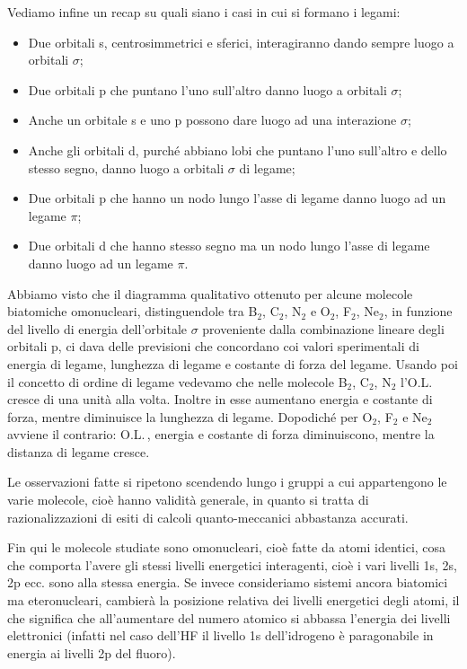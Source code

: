 \vspace{0.2cm}Vediamo infine un recap su quali siano i casi in cui si formano i legami:
\begin{itemize}
    \item Due orbitali s, centrosimmetrici e sferici, interagiranno dando sempre luogo a orbitali $\sigma$; 
    \item Due orbitali p che puntano l'uno sull'altro danno luogo a orbitali $\sigma$;
    \item Anche un orbitale s e uno p possono dare luogo ad una interazione $\sigma$;
    \item Anche gli orbitali d, purché abbiano lobi che puntano l'uno sull'altro e dello stesso segno, danno luogo a orbitali $\sigma$ di legame;
    \item Due orbitali p che hanno un nodo lungo l'asse di legame danno luogo ad un legame $\pi$;
    \item Due orbitali d che hanno stesso segno ma un nodo lungo l'asse di legame danno luogo ad un legame $\pi$.
\end{itemize}

Abbiamo visto che il diagramma qualitativo ottenuto per alcune molecole biatomiche omonucleari, distinguendole tra B$_2$, C$_2$, N$_2$ e O$_2$, F$_2$, Ne$_2$, in funzione del livello di energia dell'orbitale $\sigma$ proveniente dalla combinazione lineare degli orbitali p, ci dava delle previsioni che concordano coi valori sperimentali di energia di legame, lunghezza di legame e costante di forza del legame. Usando poi il concetto di ordine di legame vedevamo che nelle molecole B$_2$, C$_2$, N$_2$ l'O.L. cresce di una unità alla volta. Inoltre in esse aumentano energia e costante di forza, mentre diminuisce la lunghezza di legame. Dopodiché per O$_2$, F$_2$ e Ne$_2$ avviene il contrario: O.L.\,, energia e costante di forza diminuiscono, mentre la distanza di legame cresce.

Le osservazioni fatte si ripetono scendendo lungo i gruppi a cui appartengono le varie molecole, cioè hanno validità generale, in quanto si tratta di razionalizzazioni di esiti di calcoli quanto-meccanici abbastanza accurati.

Fin qui le molecole studiate sono omonucleari, cioè fatte da atomi identici, cosa che comporta l'avere gli stessi livelli energetici interagenti, cioè i vari livelli 1s, 2s, 2p ecc. sono alla stessa energia. Se invece consideriamo sistemi ancora biatomici ma eteronucleari, cambierà la posizione relativa dei livelli energetici degli atomi, il che significa che all'aumentare del numero atomico si abbassa l'energia dei livelli elettronici (infatti nel caso dell'HF il livello 1s dell'idrogeno è paragonabile in energia ai livelli 2p del fluoro).

